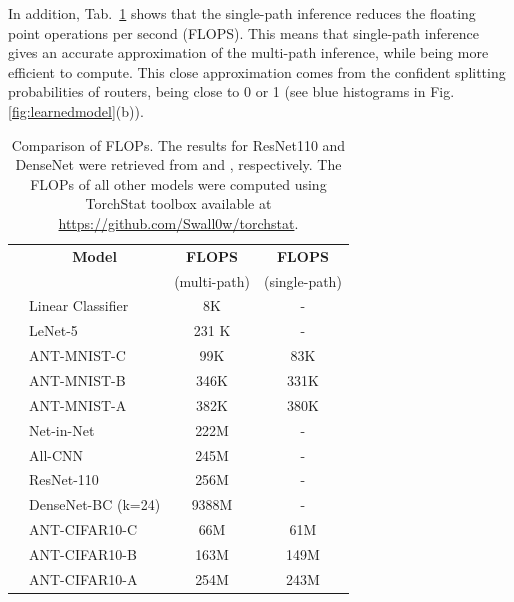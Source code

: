 In addition, Tab.~\ref{tab:flops} shows that the single-path inference reduces the floating point operations per second (FLOPS). This means that single-path inference gives an accurate approximation of the multi-path inference, while being more efficient to compute. This close approximation comes from the confident splitting probabilities of routers, being close to 0 or 1 (see blue histograms in Fig. \ref{fig:learnedmodel}(b)).

\begin{table}[h]
	\caption{\footnotesize Comparison of FLOPs. The results for ResNet110 and DenseNet were retrieved from \cite{guan2017energy} and \cite{huang2018condensenet}, respectively. The FLOPs of all other models were computed using TorchStat toolbox available at \url{https://github.com/Swall0w/torchstat}.  \label{tab:flops}}
	\vspace{-5mm}
	\footnotesize
	\center
	\begin{tabular}{|c|l|c|c|}
		\hline
		&\multicolumn{1}{|c}{\textbf{Model}} &  \multicolumn{1}{|c|}{\textbf{FLOPS}} & \multicolumn{1}{c|}{\textbf{FLOPS}}  \\
		& &(multi-path) & (single-path)  \\
		\hline
		\parbox[t]{2mm}{}
		&Linear Classifier & 8K & -   \\
		&LeNet-5 & 231 K & -  \\
		&ANT-MNIST-C & 99K & 83K  \\
		&ANT-MNIST-B & 346K & 331K \\
		&ANT-MNIST-A & 382K & 380K  \\
		\hline
		
		\parbox[t]{2mm}{}&Net-in-Net & 222M &- \\
		&All-CNN & 245M & -\\
		&ResNet-110 & 256M&- \\
		&DenseNet-BC (k=24)& 9388M &- \\
		&ANT-CIFAR10-C & 66M & 61M  \\
		&ANT-CIFAR10-B & 163M & 149M  \\
		&ANT-CIFAR10-A & 254M & 243M  \\
		\hline
	\end{tabular}
\end{table}


